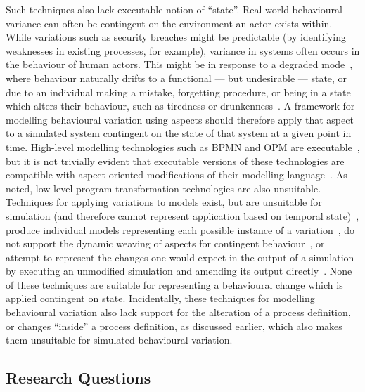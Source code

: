 Such techniques also lack executable notion of ``state''. Real-world behavioural
variance can often be contingent on the environment an actor exists within.
While variations such as security breaches might be predictable (by identifying
weaknesses in existing processes, for example), variance in \sociotechnical
systems often occurs in the behaviour of human actors. This might be in response
to a degraded mode~\cite{johnson2007degradedmodes}, where behaviour naturally
drifts to a functional --- but undesirable --- state, or due to an individual
making a mistake, forgetting procedure, or being in a state which alters their
behaviour, such as tiredness or drunkenness~\cite{aranTheatreThesis}. A
framework for modelling behavioural variation using aspects should therefore
apply that aspect to a simulated system contingent on the state of that system
at a given point in time. High-level modelling technologies such as BPMN and OPM
are executable~\cite{ExecutableBPMNMitsyuk,opm_original}, but it is not trivially
evident that executable versions of these technologies are compatible with
aspect-oriented modifications of their modelling
language~\cite{charfi2010AO4BPMN,Cappelli_AOBPM}. As noted, low-level program
transformation technologies are also unsuitable. Techniques for applying
variations to models exist, but are unsuitable for simulation (and therefore
cannot represent application based on temporal state)~\cite{stocker2013secsy},
produce individual models representing each possible instance of a
variation~\cite{pourmasoumi2015business}, do not support the dynamic weaving of
aspects for contingent behaviour~\cite{Machado_2011}, or attempt to represent
the changes one would expect in the output of a simulation by executing an
unmodified simulation and amending its output
directly~\cite{shugurov2014generation}. None of these techniques are suitable
for representing a behavioural change which is applied contingent on state.
Incidentally, these techniques for modelling behavioural variation also lack
support for the alteration of a process definition, or changes ``inside'' a
process definition, as discussed earlier, which also makes them unsuitable for
simulated behavioural variation.

\subsection{Research Questions}
\label{subsec:rqs}
\label{rqs}

